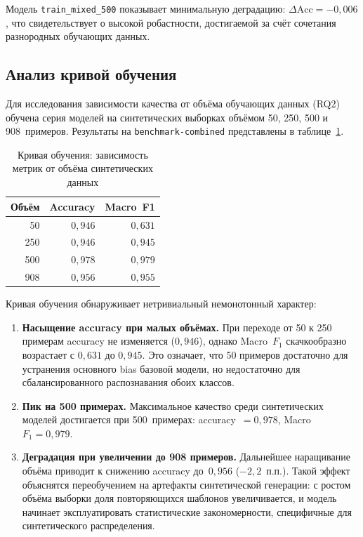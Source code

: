 Модель \texttt{train\_mixed\_500} показывает минимальную деградацию: $\Delta\text{Acc} = -0{,}006$, что свидетельствует о высокой робастности, достигаемой за счёт сочетания разнородных обучающих данных.

\subsection{Анализ кривой обучения} \label{subsec:learning_curve}

Для исследования зависимости качества от объёма обучающих данных (RQ2) обучена серия моделей на синтетических выборках объёмом 50, 250, 500 и 908~примеров. Результаты на \texttt{benchmark-combined} представлены в таблице~\ref{tab:learning_curve}.

\begin{table}[H]
\centering
\caption{Кривая обучения: зависимость метрик от объёма синтетических данных}
\label{tab:learning_curve}
\def\arraystretch{1.15}
\begin{tabular}{r r r}
    \toprule
    \textbf{Объём} & \textbf{Accuracy} & \textbf{Macro~F1} \\
    \midrule
    50  & $0{,}946$ & $0{,}631$ \\
    250 & $0{,}946$ & $0{,}945$ \\
    500 & $0{,}978$ & $0{,}979$ \\
    908 & $0{,}956$ & $0{,}955$ \\
    \bottomrule
\end{tabular}
\end{table}

Кривая обучения обнаруживает нетривиальный немонотонный характер:
\begin{enumerate}
    \item \textbf{Насыщение accuracy при малых объёмах.} При переходе от 50 к 250 примерам accuracy не изменяется ($0{,}946$), однако Macro~$F_1$ скачкообразно возрастает с $0{,}631$ до $0{,}945$. Это означает, что 50 примеров достаточно для устранения основного bias базовой модели, но недостаточно для сбалансированного распознавания обоих классов.

    \item \textbf{Пик на 500 примерах.} Максимальное качество среди синтетических моделей достигается при 500~примерах: accuracy~$= 0{,}978$, Macro~$F_1 = 0{,}979$.

    \item \textbf{Деградация при увеличении до 908 примеров.} Дальнейшее наращивание объёма приводит к снижению accuracy до~$0{,}956$ ($-2{,}2$~п.п.). Такой эффект объяснятся переобучением на артефакты синтетической генерации: с ростом объёма выборки доля повторяющихся шаблонов увеличивается, и модель начинает эксплуатировать статистические закономерности, специфичные для синтетического распределения.
\end{enumerate}

